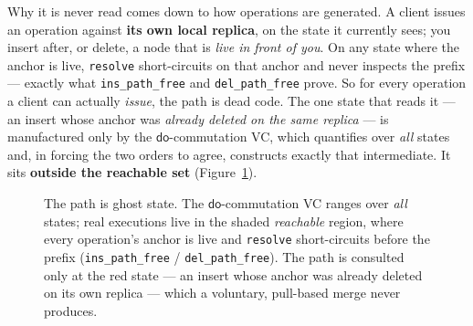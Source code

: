 \documentclass[11pt]{article}
\newcommand{\doo}{\mathsf{do}}
\begin{document}
Why it is never read comes down to how operations are generated. A client issues
an operation against \textbf{its own local replica}, on the state it currently
sees; you insert after, or delete, a node that is \emph{live in front of you}. On
any state where the anchor is live, \texttt{resolve} short-circuits on that anchor
and never inspects the prefix --- exactly what \texttt{ins\_path\_free} and
\texttt{del\_path\_free} prove. So for every operation a client can actually
\emph{issue}, the path is dead code. The one state that reads it --- an insert
whose anchor was \emph{already deleted on the same replica} --- is manufactured
only by the $\doo$-commutation VC, which quantifies over \emph{all} states and, in
forcing the two orders to agree, constructs exactly that intermediate. It sits
\textbf{outside the reachable set} (Figure~\ref{fig:ghost}).

\begin{figure}[h]
\centering
{}
\caption{The path is ghost state. The $\doo$-commutation VC ranges over \emph{all}
states; real executions live in the shaded \emph{reachable} region, where every
operation's anchor is live and \texttt{resolve} short-circuits before the prefix
(\texttt{ins\_path\_free} / \texttt{del\_path\_free}). The path is consulted only at
the red state --- an insert whose anchor was already deleted on its own replica ---
which a voluntary, pull-based merge never produces.}
\label{fig:ghost}
\end{figure}
\end{document}
